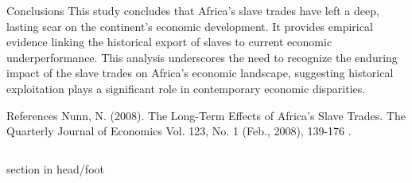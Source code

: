 \documentclass[final]{beamer}
\begin{document}
\begin{frame}[t]
\begin{columns}[T]
\begin{column}{.32\textwidth}
    \vspace{1cm} %

    \begin{block}{\Huge Conclusions} %
    \Large %
    This study concludes that Africa's slave trades have left a deep, lasting scar on the continent's economic development. It provides empirical evidence linking the historical export of slaves to current economic underperformance. This analysis underscores the need to recognize the enduring impact of the slave trades on Africa's economic landscape, suggesting historical exploitation plays a significant role in contemporary economic disparities.
    \end{block}

    \vspace{1cm} %

    \begin{block}{\Huge References} %
    \Large %
    Nunn, N. (2008). The Long-Term Effects of Africa's Slave Trades. The Quarterly Journal of Economics Vol. 123, No. 1 (Feb., 2008), 139-176 .
    \end{block}

\end{column}

\end{columns}
    \vspace{1cm} %
\begin{beamercolorbox}[center]{section in head/foot}
\end{beamercolorbox}

\end{frame}
\end{document}
